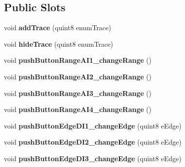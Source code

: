 \subsection*{Public Slots}
\begin{DoxyCompactItemize}
\item 
\mbox{\label{class_trigger_window_a3f532a37074e527061d58fadc72debdf}} 
void {\bfseries add\+Trace} (quint8 enum\+Trace)
\item 
\mbox{\label{class_trigger_window_a4ccf1e4e611d83a1f9d0ef8bf67ece4a}} 
void {\bfseries hide\+Trace} (quint8 enum\+Trace)
\item 
\mbox{\label{class_trigger_window_a225fea6a5bd527b8869692620f2ff7bf}} 
void {\bfseries push\+Button\+Range\+A\+I1\+\_\+change\+Range} ()
\item 
\mbox{\label{class_trigger_window_a9c56941cd877fa003ffa80dfd40447ac}} 
void {\bfseries push\+Button\+Range\+A\+I2\+\_\+change\+Range} ()
\item 
\mbox{\label{class_trigger_window_a01dc93ec4152d2b3a3683fb34137741e}} 
void {\bfseries push\+Button\+Range\+A\+I3\+\_\+change\+Range} ()
\item 
\mbox{\label{class_trigger_window_a1bc8631343bb16ba855a0f4c3790d2f5}} 
void {\bfseries push\+Button\+Range\+A\+I4\+\_\+change\+Range} ()
\item 
\mbox{\label{class_trigger_window_adba8184e003f285a440728fb69fdbe49}} 
void {\bfseries push\+Button\+Edge\+D\+I1\+\_\+change\+Edge} (quint8 e\+Edge)
\item 
\mbox{\label{class_trigger_window_af58a16032424b426d60d0b9ce4c5206b}} 
void {\bfseries push\+Button\+Edge\+D\+I2\+\_\+change\+Edge} (quint8 e\+Edge)
\item 
\mbox{\label{class_trigger_window_af292fee829e1ff87388317666d56e960}} 
void {\bfseries push\+Button\+Edge\+D\+I3\+\_\+change\+Edge} (quint8 e\+Edge)
\item 
\mbox{\label{class_trigger_window_a28d8e89276411ae9943de7cad4f290f6}} 

\end{DoxyCompactItemize}

